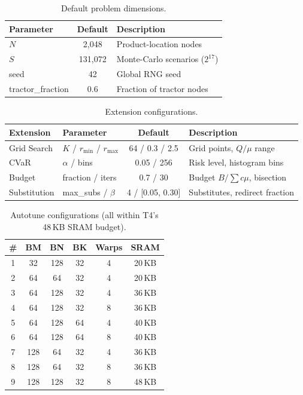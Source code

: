 \begin{table}[H]
\centering\small
\caption*{Default problem dimensions.}
\begin{tabular}{@{} l c l @{}}
    \toprule
    \textbf{Parameter} & \textbf{Default} & \textbf{Description} \\
    \midrule
    $N$ & 2,048 & Product-location nodes \\
    $S$ & 131,072 & Monte-Carlo scenarios ($2^{17}$) \\
    seed & 42 & Global RNG seed \\
    tractor\_fraction & 0.6 & Fraction of tractor nodes \\
    \bottomrule
\end{tabular}
\end{table}

\begin{table}[H]
\centering\small
\caption*{Extension configurations.}
\begin{tabular}{@{} l l c l @{}}
    \toprule
    \textbf{Extension} & \textbf{Parameter} & \textbf{Default} & \textbf{Description} \\
    \midrule
    Grid Search   & $K$ / $r_{\min}$ / $r_{\max}$ & 64 / 0.3 / 2.5 & Grid points, $Q/\mu$ range \\
    CVaR          & $\alpha$ / bins              & 0.05 / 256       & Risk level, histogram bins \\
    Budget        & fraction / iters             & 0.7 / 30         & Budget $B/\sum c\mu$, bisection \\
    Substitution  & max\_subs / $\beta$          & 4 / [0.05, 0.30] & Substitutes, redirect fraction \\
    \bottomrule
\end{tabular}
\end{table}

\begin{table}[H]
\centering\small
\caption*{Autotune configurations (all within T4's 48\,KB SRAM budget).}
\begin{tabular}{@{} c c c c c c @{}}
    \toprule
    \# & BM & BN & BK & Warps & SRAM \\
    \midrule
    1 &  32 & 128 & 32 & 4 & 20\,KB \\
    2 &  64 &  64 & 32 & 4 & 20\,KB \\
    3 &  64 & 128 & 32 & 4 & 36\,KB \\
    4 &  64 & 128 & 32 & 8 & 36\,KB \\
    5 &  64 & 128 & 64 & 4 & 40\,KB \\
    6 &  64 & 128 & 64 & 8 & 40\,KB \\
    7 & 128 &  64 & 32 & 4 & 36\,KB \\
    8 & 128 &  64 & 32 & 8 & 36\,KB \\
    9 & 128 & 128 & 32 & 8 & 48\,KB \\
    \bottomrule
\end{tabular}
\end{table}

